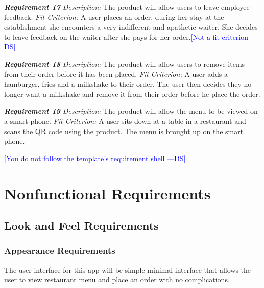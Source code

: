 \documentclass[12pt, titlepage]{article}
\newcommand{\authornote}[3]{\textcolor{#1}{[#3 ---#2]}}
\newcommand{\authornote}[3]{}
\newcommand{\ds}[1]{\authornote{blue}{DS}{#1}}
\begin{document}
\noindent\textbf{\textit{Requirement 17}}\newline
\textit{Description:}\newline
The product will allow users to leave employee feedback. \newline\newline
\textit{Fit Criterion:}\newline 
A user places an order, during her stay at the establishment she encounters a very indifferent and apathetic waiter. She decides to leave feedback on the waiter after she pays for her order.\ds{Not a fit criterion}
\newline

\noindent\textbf{\textit{Requirement 18}}\newline
\textit{Description:}\newline
The product will allow users to remove items from their order before it has been placed. \newline\newline
\textit{Fit Criterion:}\newline 
A user adds a hamburger, fries and a milkshake to their order. The user then decides they no longer want a milkshake and remove it from their order before he place the order.
\newline

\noindent\textbf{\textit{Requirement 19}}\newline
\textit{Description:}\newline
The product will allow the menu to be viewed on a smart phone. \newline\newline
\textit{Fit Criterion:}\newline 
A user sits down at a table in a restaurant and scans the QR code using the product. The menu is brought up on the smart phone.
\newline

\ds{You do not follow the template's requirement shell}

\section{Nonfunctional Requirements}
\subsection{Look and Feel Requirements}
\subsubsection{Appearance Requirements}
The user interface for this app will be simple minimal interface that allows the user to view restaurant menu and place an order with no complications. 
\end{document}
